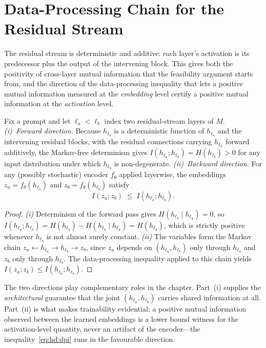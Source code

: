 \section{Data-Processing Chain for the Residual Stream}
\label{sec:hd-proofs:dpi}

The residual stream is deterministic and additive: each layer's activation is
its predecessor plus the output of the intervening block. This gives both the
positivity of cross-layer mutual information that the feasibility argument starts
from, and the direction of the data-processing inequality that lets a positive
mutual information measured at the \emph{embedding} level certify a positive
mutual information at the \emph{activation} level.

\begin{lemma}\label{lem:hd:dpi}
Fix a prompt and let $\ell_a < \ell_b$ index two residual-stream layers of $M$.
\emph{(i)~Forward direction.} Because $h_{\ell_b}$ is a deterministic function of
$h_{\ell_a}$ and the intervening residual blocks, with the residual connections
carrying $h_{\ell_a}$ forward additively, the Markov-free determinism gives
$I(h_{\ell_a}; h_{\ell_b}) = H(h_{\ell_b}) > 0$ for any input distribution under
which $h_{\ell_b}$ is non-degenerate. \emph{(ii)~Backward direction.} For any
(possibly stochastic) encoder $f_\theta$ applied layerwise, the embeddings
$z_a = f_\theta(h_{\ell_a})$ and $z_b = f_\theta(h_{\ell_b})$ satisfy
\begin{equation} I(z_a; z_b) \;\le\; I(h_{\ell_a}; h_{\ell_b}). \label{eq:hd:dpi} \end{equation}
\end{lemma}

\begin{proof}
\emph{(i)} Determinism of the forward pass gives
$H(h_{\ell_b} \mid h_{\ell_a}) = 0$, so
$I(h_{\ell_a}; h_{\ell_b}) = H(h_{\ell_b}) - H(h_{\ell_b}\mid h_{\ell_a}) = H(h_{\ell_b})$,
which is strictly positive whenever $h_{\ell_b}$ is not almost surely constant.
\emph{(ii)} The variables form the Markov chain
$z_a \leftarrow h_{\ell_a} \rightarrow h_{\ell_b} \rightarrow z_b$, since $z_a$
depends on $(h_{\ell_a},h_{\ell_b})$ only through $h_{\ell_a}$ and $z_b$ only
through $h_{\ell_b}$. The data-processing inequality applied to this chain yields
$I(z_a; z_b) \le I(h_{\ell_a}; h_{\ell_b})$.
\end{proof}

\begin{remark}
The two directions play complementary roles in the chapter. Part~(i) supplies the
\emph{architectural} guarantee that the joint $(h_{\ell_a},h_{\ell_b})$ carries
shared information at all. Part~(ii) is what makes trainability evidential: a
positive mutual information observed between the learned embeddings is a lower
bound witness for the activation-level quantity, never an artifact of the
encoder---the inequality~\eqref{eq:hd:dpi} runs in the favourable direction.
\end{remark}

